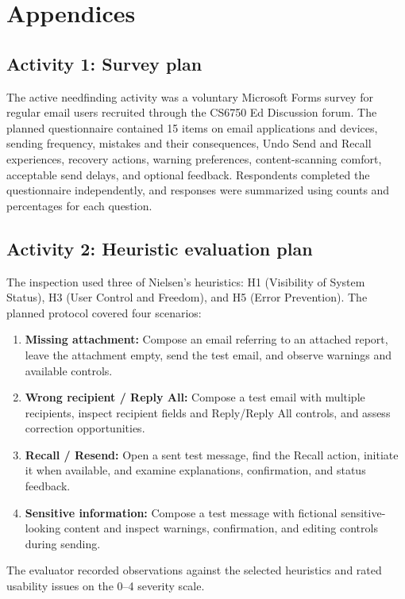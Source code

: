 \documentclass[letterpaper]{jdf}
\begin{document}
\section{Appendices}\label{sec:appendices}

\subsection{Activity 1: Survey plan}\label{app:survey-plan}
The active needfinding activity was a voluntary Microsoft Forms survey for regular email users recruited through the CS6750 Ed Discussion forum. The planned questionnaire contained 15 items on email applications and devices, sending frequency, mistakes and their consequences, Undo Send and Recall experiences, recovery actions, warning preferences, content-scanning comfort, acceptable send delays, and optional feedback. Respondents completed the questionnaire independently, and responses were summarized using counts and percentages for each question.

\subsection{Activity 2: Heuristic evaluation plan}\label{app:heuristic-plan}
The inspection used three of Nielsen's heuristics: H1 (Visibility of System Status), H3 (User Control and Freedom), and H5 (Error Prevention). The planned protocol covered four scenarios:
\begin{enumerate}
\item \textbf{Missing attachment:} Compose an email referring to an attached report, leave the attachment empty, send the test email, and observe warnings and available controls.
\item \textbf{Wrong recipient / Reply All:} Compose a test email with multiple recipients, inspect recipient fields and Reply/Reply All controls, and assess correction opportunities.
\item \textbf{Recall / Resend:} Open a sent test message, find the Recall action, initiate it when available, and examine explanations, confirmation, and status feedback.
\item \textbf{Sensitive information:} Compose a test message with fictional sensitive-looking content and inspect warnings, confirmation, and editing controls during sending.
\end{enumerate}
The evaluator recorded observations against the selected heuristics and rated usability issues on the 0--4 severity scale.
\end{document}
